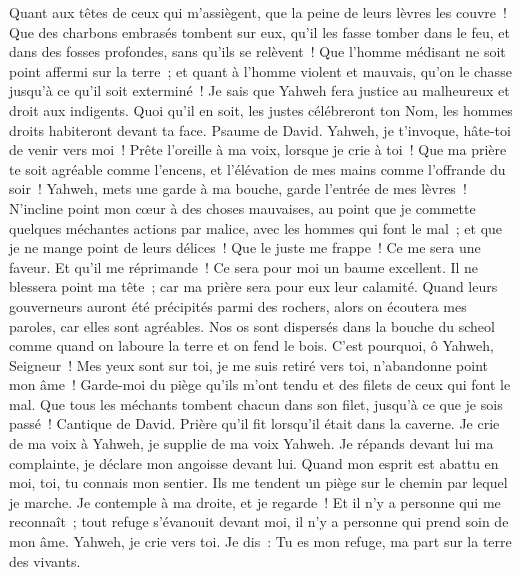 \begin{multicols}{2}
Quant aux têtes de ceux qui m'assiègent, que la peine de leurs lèvres les couvre~!
Que des charbons embrasés tombent sur eux, qu'il les fasse tomber dans le feu, et dans des fosses profondes, sans qu'ils se relèvent~!
Que l'homme médisant ne soit point affermi sur la terre~; et quant à l'homme violent et mauvais, qu'on le chasse jusqu'à ce qu'il soit exterminé~!
Je sais que Yahweh fera justice au malheureux et droit aux indigents.
Quoi qu'il en soit, les justes célébreront ton Nom, les hommes droits habiteront devant ta face.
\VerseOne{}Psaume de David. Yahweh, je t'invoque, hâte-toi de venir vers moi~! Prête l'oreille à ma voix, lorsque je crie à toi~!
Que ma prière te soit agréable comme l'encens, et l'élévation de mes mains comme l'offrande du soir~!
Yahweh, mets une garde à ma bouche, garde l'entrée de mes lèvres~!
N'incline point mon cœur à des choses mauvaises, au point que je commette quelques méchantes actions par malice, avec les hommes qui font le mal~; et que je ne mange point de leurs délices~!
Que le juste me frappe~! Ce me sera une faveur. Et qu'il me réprimande~! Ce sera pour moi un baume excellent. Il ne blessera point ma tête~; car ma prière sera pour eux leur calamité.
Quand leurs gouverneurs auront été précipités parmi des rochers, alors on écoutera mes paroles, car elles sont agréables.
Nos os sont dispersés dans la bouche du scheol comme quand on laboure la terre et on fend le bois.
C'est pourquoi, ô Yahweh, Seigneur~! Mes yeux sont sur toi, je me suis retiré vers toi, n'abandonne point mon âme~!
Garde-moi du piège qu'ils m'ont tendu et des filets de ceux qui font le mal.
Que tous les méchants tombent chacun dans son filet, jusqu'à ce que je sois passé~!
\VerseOne{}Cantique de David. Prière qu'il fit lorsqu'il était dans la caverne.
Je crie de ma voix à Yahweh, je supplie de ma voix Yahweh.
Je répands devant lui ma complainte, je déclare mon angoisse devant lui.
Quand mon esprit est abattu en moi, toi, tu connais mon sentier. Ils me tendent un piège sur le chemin par lequel je marche.
Je contemple à ma droite, et je regarde~! Et il n'y a personne qui me reconnaît~; tout refuge s'évanouit devant moi, il n'y a personne qui prend soin de mon âme.
Yahweh, je crie vers toi. Je dis~: Tu es mon refuge, ma part sur la terre des vivants.

\end{multicols}
